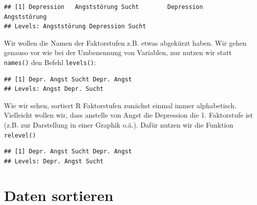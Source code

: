 \documentclass[
]{book}
\newenvironment{Shaded}{\begin{snugshade}}{\end{snugshade}}
\newcommand{\FunctionTok}[1]{\textcolor[rgb]{0.13,0.29,0.53}{\textbf{#1}}}
\newcommand{\NormalTok}[1]{#1}
\newcommand{\OtherTok}[1]{\textcolor[rgb]{0.56,0.35,0.01}{#1}}
\newcommand{\SpecialCharTok}[1]{\textcolor[rgb]{0.81,0.36,0.00}{\textbf{#1}}}
\newcommand{\StringTok}[1]{\textcolor[rgb]{0.31,0.60,0.02}{#1}}
\begin{document}
\begin{verbatim}
## [1] Depression   Angststörung Sucht        Depression   Angststörung
## Levels: Angststörung Depression Sucht
\end{verbatim}

Wir wollen die Namen der Faktorstufen z.B. etwas abgekürzt haben. Wir gehen genauso vor wie bei der Umbenennung von Variablen, nur nutzen wir statt \texttt{names()} den Befehl \texttt{levels()}:

\begin{Shaded}
\end{Shaded}

\begin{verbatim}
## [1] Depr. Angst Sucht Depr. Angst
## Levels: Angst Depr. Sucht
\end{verbatim}

Wie wir sehen, sortiert R Faktorstufen zunächst einmal immer alphabetisch. Vielleicht wollen wir, dass anstelle von Angst die Depression die 1. Faktorstufe ist (z.B. zur Darstellung in einer Graphik o.ä.). Dafür nutzen wir die Funktion \texttt{relevel()}

\begin{Shaded}
\end{Shaded}

\begin{verbatim}
## [1] Depr. Angst Sucht Depr. Angst
## Levels: Depr. Angst Sucht
\end{verbatim}

\section{Daten sortieren}\label{daten-sortieren}
\end{document}

